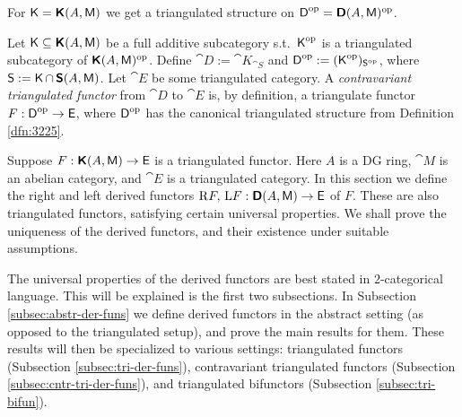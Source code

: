 For $\operatorname{\mathsf{K}} = \boldsymbol{\mathsf{K}}(A, \operatorname{\mathsf{M}})$ we get a triangulated structure on 
$\operatorname{\mathsf{D}}^{\mathrm{op}} = \boldsymbol{\mathsf{D}}(A, \operatorname{\mathsf{M}})^{\mathrm{op}}$.

\begin{dfn} \label{dfn:3226} 
Let $\operatorname{\mathsf{K}} \subseteq \boldsymbol{\mathsf{K}}(A, \operatorname{\mathsf{M}})$ be a full additive subcategory s.t.\ 
$\operatorname{\mathsf{K}}^{\mathrm{op}}$ is a triangulated subcategory of 
$\boldsymbol{\mathsf{K}}(A, \operatorname{\mathsf{M}})^{\mathrm{op}}$.
Define
$\cat{D} := \cat{K}_{\cat{S}}$
and 
$\operatorname{\mathsf{D}}^{\mathrm{op}} := (\operatorname{\mathsf{K}}^{\mathrm{op}})_{\operatorname{\mathsf{S}}^{\mathrm{op}}}$, 
where $\operatorname{\mathsf{S}} := \operatorname{\mathsf{K}} \cap \, \boldsymbol{\mathsf{S}}(A, \operatorname{\mathsf{M}})$.
Let $\cat{E}$ be some triangulated category. A 
{\em contravariant triangulated functor}%
from $\cat{D}$ to $\cat{E}$ is, by definition, a 
triangulate functor 
$F : \operatorname{\mathsf{D}}^{\mathrm{op}}  \to \operatorname{\mathsf{E}}$,
where $\operatorname{\mathsf{D}}^{\mathrm{op}}$ has the canonical triangulated structure from 
Definition \ref{dfn:3225}.
\end{dfn}







\cleardoublepage
{} \label{sec:der-funcs}

\AYcopyright

Suppose 
$F : \boldsymbol{\mathsf{K}}(A, \operatorname{\mathsf{M}}) \to \operatorname{\mathsf{E}}$
is a triangulated functor. Here $A$ is a DG ring, $\cat{M}$ is an abelian 
category, and $\cat{E}$ is a triangulated category. 
In this section we define the right and left derived functors
$\mathrm{R} F, \, \mathrm{L} F : \boldsymbol{\mathsf{D}}(A, \operatorname{\mathsf{M}}) \to \operatorname{\mathsf{E}}$ 
of $F$. These are also triangulated functors, satisfying certain universal 
properties. We shall prove the uniqueness of the derived functors, and their 
existence under suitable assumptions.
 
The universal properties of the derived functors are best stated in 
$2$-categorical language. This will be explained is the first two subsections. 
In Subsection \ref{subsec:abstr-der-funs} we define derived functors in the 
abstract setting (as opposed to the triangulated setup), and prove the main 
results for them. These results will then be specialized to various settings:
triangulated functors (Subsection \ref{subsec:tri-der-funs}), contravariant 
triangulated functors (Subsection \ref{subsec:cntr-tri-der-funs}), and 
triangulated bifunctors (Subsection \ref{subsec:tri-bifun}). 



\label{subsec:2-cat-not}

